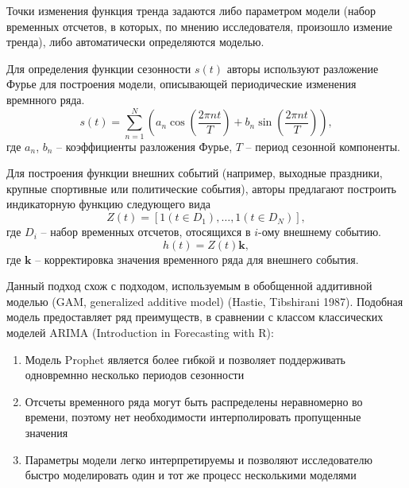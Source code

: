 Точки изменения функция тренда задаются либо параметром модели (набор временных отсчетов, в которых, по мнению
исследователя, произошло измение тренда), либо автоматически определяются моделью. 

Для определения функции сезонности $s(t)$ авторы используют разложение Фурье для построения модели, описывающей
периодические изменения времнного ряда.
\begin{equation}
    s(t) = \sum \limits_{n=1}^N \left( a_n \cos{\left( \dfrac{2\pi n t}{T} \right)} + b_n \sin{\left( \dfrac{2\pi n t}{T} \right)} \right),
\end{equation}
где $a_n$, $b_n$ -- коэффициенты разложения Фурье, $T$ -- период сезонной компоненты.

Для построения функции внешних событий (например, выходные праздники, крупные спортивные или политические события),
авторы предлагают построить индикаторную функцию следующего вида
\begin{equation}
    Z(t) = \left[ 1 (t \in D_1), \dots, 1 (t \in D_N)\right],
\end{equation}
где $D_i$ -- набор временных отсчетов, отосящихся в $i$-ому внешнему событию.
\begin{equation}
    h(t) = Z(t)\mathbf{k},
\end{equation}
где $\mathbf{k}$ -- корректировка значения временного ряда для внешнего события.

Данный подход схож с подходом, используемым в обобщенной аддитивной моделью (GAM, generalized additive model) 
(Hastie, Tibshirani 1987). Подобная модель предоставляет ряд преимуществ, в сравнении с классом классических моделей ARIMA
(Introduction in Forecasting with R):
\begin{enumerate}
    \item Модель Prophet является более гибкой и позволяет поддерживать одновремнно несколько периодов сезонности
    \item Отсчеты временного ряда могут быть распределены неравномерно во времени, поэтому нет необходимости
    интерполировать пропущенные значения
    \item Параметры модели легко интерпретируемы и позволяют исследователю быстро моделировать один и тот же процесс
    несколькими моделями
\end{enumerate}
